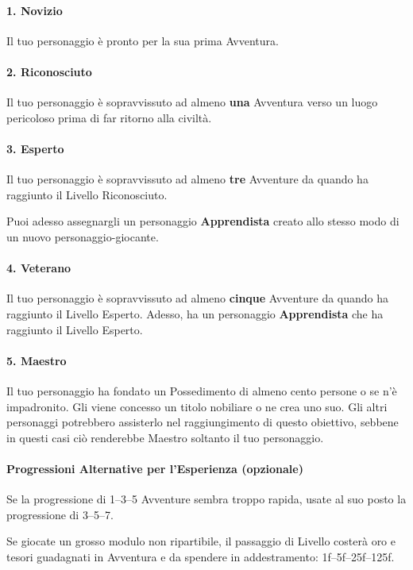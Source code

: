 \documentclass[itdr]{subfiles}
\begin{document}
\paragraph{1. Novizio}
Il tuo personaggio è pronto per la sua prima Avventura.

\paragraph{2. Riconosciuto}
Il tuo personaggio è sopravvissuto ad almeno \textbf{una} Avventura verso un luogo pericoloso prima di far ritorno alla civiltà. 

\paragraph{3. Esperto}
Il tuo personaggio è sopravvissuto ad almeno \textbf{tre} Avventure da quando ha raggiunto il Livello Riconosciuto. 

Puoi adesso assegnargli un personaggio \textbf{Apprendista} creato allo stesso modo di un nuovo personaggio-giocante. 

\paragraph{4. Veterano}
Il tuo personaggio è sopravvissuto ad almeno \textbf{cinque} Avventure da quando ha raggiunto il Livello Esperto. Adesso, ha un personaggio \textbf{Apprendista} che ha raggiunto il Livello Esperto. 

\paragraph{5. Maestro}
Il tuo personaggio ha fondato un Possedimento di almeno cento persone o se n’è impadronito. Gli viene concesso un titolo nobiliare o ne crea uno suo. Gli altri personaggi potrebbero assisterlo nel raggiungimento di questo obiettivo, sebbene in questi casi ciò renderebbe Maestro soltanto il tuo personaggio. 

\vfill
\begin{dbox}
	\paragraph{Progressioni Alternative per l’Esperienza (opzionale)}
	Se la progressione di 1--3--5 Avventure sembra troppo rapida, usate al suo posto la progressione di 3--5--7. 

	Se giocate un grosso modulo non ripartibile, il passaggio di Livello costerà oro e tesori guadagnati in Avventura e da spendere in addestramento: 1f--5f--25f--125f. 
\end{dbox}
\end{document}
